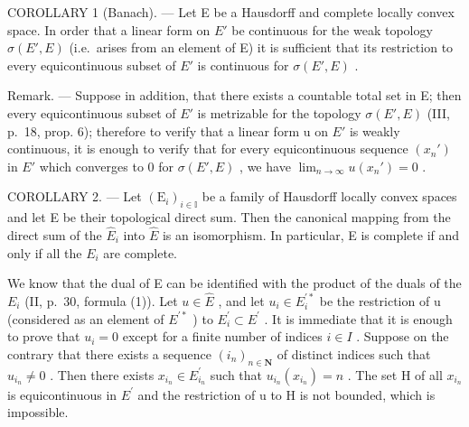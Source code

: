 COROLLARY 1 (Banach). --- Let E be a Hausdorff and complete locally convex space. In order that a linear form on \(E'\) be continuous for the weak topology \(\sigma(E', E)\) (i.e.~arises from an element of E) it is sufficient that its restriction to every equicontinuous subset of \(E'\) is continuous for \(\sigma(E', E)\) .

Remark. --- Suppose in addition, that there exists a countable total set in E; then every equicontinuous subset of \(E'\) is metrizable for the topology \(\sigma(E', E)\) (III, p.~18, prop. 6); therefore to verify that a linear form u on \(E'\) is weakly continuous, it is enough to verify that for every equicontinuous sequence \((x_{n}')\) in \(E'\) which converges to 0 for \(\sigma(E', E)\) , we have \(\lim_{n \to \infty} u(x_{n}') = 0\) .

COROLLARY 2. --- Let \((\mathrm{E}_{i})_{i\in\mathbb{I}}\) be a family of Hausdorff locally convex spaces and let E be their topological direct sum. Then the canonical mapping from the direct sum of the \(\hat{E}_{i}\) into \(\hat{E}\) is an isomorphism. In particular, E is complete if and only if all the \(E_{i}\) are complete.

We know that the dual of E can be identified with the product of the duals of the \(E_{i}\) (II, p.~30, formula (1)). Let \(u \in \hat{E}\) , and let \(u_{i} \in E_{i}^{\prime *}\) be the restriction of u (considered as an element of \(E^{\prime *}\) ) to \(E_{i}^{\prime} \subset E^{\prime}\) . It is immediate that it is enough to prove that \(u_{i} = 0\) except for a finite number of indices \(i \in I\) . Suppose on the contrary that there exists a sequence \((i_{n})_{n \in \mathbf{N}}\) of distinct indices such that \(u_{i_{n}} \neq 0\) . Then there exists \(x_{i_{n}} \in E_{i_{n}}^{\prime}\) such that \(u_{i_{n}}(x_{i_{n}}) = n\) . The set H of all \(x_{i_{n}}\) is equicontinuous in \(E^{\prime}\) and the restriction of u to H is not bounded, which is impossible.

